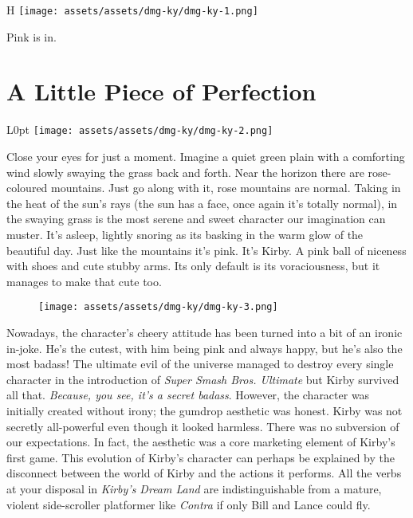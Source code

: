 \documentclass{book}
\begin{document}
\begin{wrapfigure}{H}{\linewidth}
\vskip 4pt
\centering \texttt{[image: assets/assets/dmg-ky/dmg-ky-1.png]}\par\pagetwodescription Pink is in.\end{wrapfigure}
\clearpage

\FloatBarrier\needspace{5pt}\section*{A Little Piece of Perfection}\nopagebreak[4]
\begin{wrapfigure}{L}{0pt} \texttt{[image: assets/assets/dmg-ky/dmg-ky-2.png]}\end{wrapfigure}
Close your eyes for just a moment. Imagine a quiet green plain with a comforting wind slowly swaying the grass back and forth. Near the horizon there are rose-coloured mountains. Just go along with it, rose mountains are normal. Taking in the heat of the sun’s rays (the sun has a face, once again it’s totally normal), in the swaying grass is the most serene and sweet character our imagination can muster. It’s asleep, lightly snoring as its basking in the warm glow of the beautiful day. Just like the mountains it’s pink. It’s Kirby. A pink ball of niceness with shoes and cute stubby arms. Its only default is its voraciousness, but it manages to make that cute too.

\begin{figure}[hbt]
\vskip 10pt
\centering \texttt{[image: assets/assets/dmg-ky/dmg-ky-3.png]}
\vskip 6pt
\end{figure}

Nowadays, the character’s cheery attitude has been turned into a bit of an ironic in-joke. He’s the cutest, with him being pink and always happy, but he’s also the most badass! The ultimate evil of the universe managed to destroy every single character in the introduction of \emph{Super Smash Bros. Ultimate} but Kirby survived all that. \emph{Because, you see, it’s a secret badass}. However, the character was initially created without irony; the gumdrop aesthetic was honest. Kirby was not secretly all-powerful even though it looked harmless. There was no subversion of our expectations. In fact, the aesthetic was a core marketing element of Kirby’s first game. This evolution of Kirby’s character can perhaps be explained by the disconnect between the world of Kirby and the actions it performs. All the verbs at your disposal in \emph{Kirby’s Dream Land} are indistinguishable from a mature, violent side-scroller platformer like \emph{Contra} if only Bill and Lance could fly.
\end{document}

